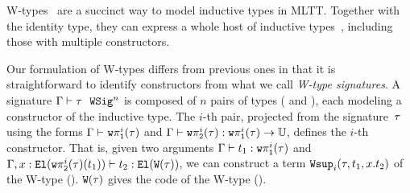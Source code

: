 

W-types~\cite{martin1984intuitionistic} are a succinct way to model
inductive types in MLTT.
Together with the identity type, they can express a whole host of inductive
types~\cite{hugunin2021not}, including those with multiple constructors.

Our formulation of W-types differs from previous ones in that it is
straightforward to identify constructors from what we call \emph{W-type signatures}.
%
A signature $ {\Gamma} \vdash {\ensuremath{\tau}} \ \ \texttt{WSig}^{n} $ is
composed of $n$ pairs of types ( and ),
%
each modeling a constructor of the inductive type.
The $i$-th pair, projected from the signature~$\tau$ using the forms
$ {\Gamma} \vdash_{} {\texttt{w}\pi^{i}_{\texttt{1}}({\tau})} $ and
$ {\Gamma} \vdash {\ensuremath{\texttt{w}\pi^{i}_{\texttt{2}}({\tau})}} : {\texttt{w}\pi^{i}_{\texttt{1}}({\tau}) \to \mathbb{U}} $,
defines the $i$-th constructor.
That is, given two arguments $ {\Gamma} \vdash {t_1} : {\texttt{w}\pi^{i}_{\texttt{1}}({\tau})} $ and
$ {\Gamma, x : \texttt{El}({\texttt{w}\pi^{i}_{\texttt{2}}({\tau})(t_1)}) } \vdash {t_2} : {\texttt{El}({\texttt{W}({\tau})})} $,
we can construct a term $\texttt{Wsup}_{i}({\tau},{t_1},{x.t_2})$ of the W-type ().
$\texttt{W}({\tau})$ gives the code of the
W-type ().

